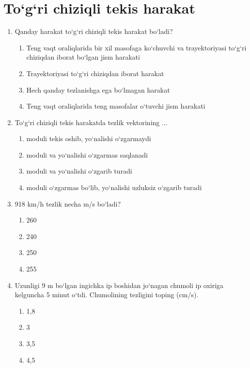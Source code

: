 \section{To‘g‘ri chiziqli tekis harakat}

\begin{enumerate}

\item Qanday harakat to‘g‘ri chiziqli tekis harakat bo‘ladi?
\begin{enumerate}[label=\Alph*)]
\item Teng vaqt oraliqlarida bir xil masofaga ko‘chuvchi va trayektoriyasi to‘g‘ri chiziqdan iborat bo‘lgan jism harakati
\item Trayektoriyasi to‘g‘ri chiziqdan iborat harakat
\item Hech qanday tezlanishga ega bo‘lmagan harakat
\item Teng vaqt oraliqlarida teng masofalar o‘tuvchi jism harakati
\end{enumerate}

\item To‘g‘ri chiziqli tekis harakatda tezlik vektorining ...
\begin{enumerate}[label=\Alph*)]

\item moduli tekis oshib, yo‘nalishi o‘zgarmaydi
\item moduli va yo‘nalishi o‘zgarmas saqlanadi
\item moduli va yo‘nalishi o‘zgarib turadi
\item moduli o‘zgarmas bo‘lib, yo‘nalishi uzluksiz o‘zgarib turadi
\end{enumerate}

\item 918 km/h tezlik necha m/s bo‘ladi?
\begin{enumerate}[label=\Alph*)]
\item 260
\item 240
\item 250
\item 255
\end{enumerate}

\item Uzunligi 9 m bo‘lgan ingichka ip boshidan jo‘nagan chumoli ip oxiriga kelguncha 5 minut o‘tdi. 
Chumolining tezligini toping (cm/s).
\begin{enumerate}[label=\Alph*)]
\item 1,8
\item 3
\item 3,5
\item 4,5
\end{enumerate}


\end{enumerate}
